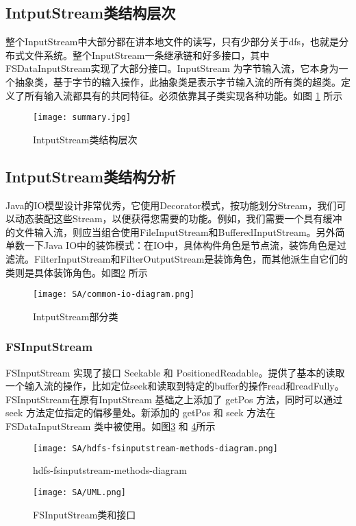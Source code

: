 	\subsection{IntputStream类结构层次} 
	整个InputStream中大部分都在讲本地文件的读写，只有少部分关于dfs，也就是分布式文件系统。整个InputStream一条继承链和好多接口，其中FSDataInputStream实现了大部分接口。InputStream 为字节输入流，它本身为一个抽象类，基于字节的输入操作，此抽象类是表示字节输入流的所有类的超类。定义了所有输入流都具有的共同特征。必须依靠其子类实现各种功能。如图 \ref{fig:graph1} 所示
	
	\begin{figure}[H]
		\centering
		\texttt{[image: summary.jpg]}
		\caption{IntputStream类结构层次}
		\label{fig:graph1}
	\end{figure}
	
	\subsection{IntputStream类结构分析} 
	Java的IO模型设计非常优秀，它使用Decorator模式，按功能划分Stream，我们可以动态装配这些Stream，以便获得您需要的功能。例如，我们需要一个具有缓冲的文件输入流，则应当组合使用FileInputStream和BufferedInputStream。另外简单数一下Java IO中的装饰模式：在IO中，具体构件角色是节点流，装饰角色是过滤流。FilterInputStream和FilterOutputStream是装饰角色，而其他派生自它们的类则是具体装饰角色。如图\ref{fig:graph2} 所示
	
	\begin{figure}[H]
		\centering
		\texttt{[image: SA/common-io-diagram.png]}
		\caption{IntputStream部分类}
		\label{fig:graph2}
	\end{figure}
	
	\subsubsection{FSInputStream}
	FSInputStream 实现了接口 Seekable 和 PositionedReadable。提供了基本的读取一个输入流的操作，比如定位seek和读取到特定的buffer的操作read和readFully。FSInputStream在原有InputStream 基础之上添加了 getPos 方法，同时可以通过 seek 方法定位指定的偏移量处。新添加的 getPos 和 seek 方法在 FSDataInputStream 类中被使用。如图\ref{fig:graph3} 和 \ref{fig:graph4}所示
	
	\begin{figure}[H]
		\centering
		\texttt{[image: SA/hdfs-fsinputstream-methods-diagram.png]}
		\caption{hdfs-fsinputstream-methods-diagram}
		\label{fig:graph3}
	\end{figure}
	\begin{figure}[H]
		\centering
		\texttt{[image: SA/UML.png]}
		\caption{FSInputStream类和接口}
		\label{fig:graph4}
	\end{figure}
	
